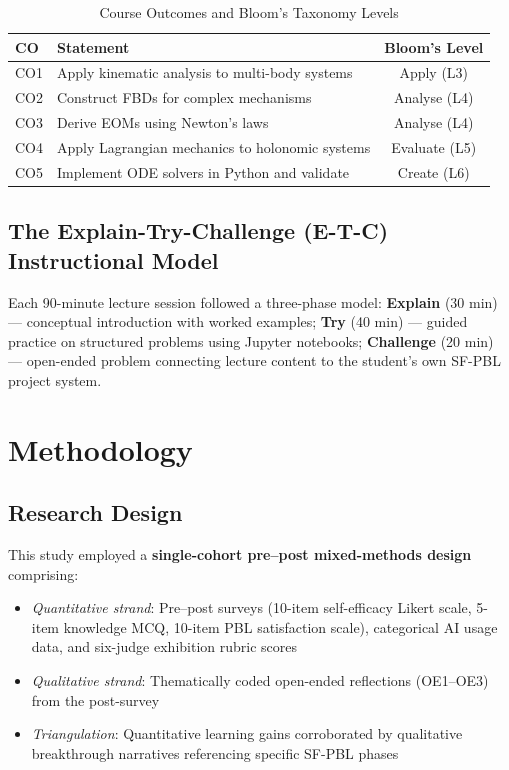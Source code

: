 \documentclass[12pt, a4paper]{article}
\begin{document}
\begin{table}[ht]
\centering
\caption{Course Outcomes and Bloom's Taxonomy Levels}
\label{tab:cos}
\begin{tabular}{p{0.5cm} p{8cm} c}
\toprule
\textbf{CO} & \textbf{Statement} & \textbf{Bloom's Level} \\
\midrule
CO1 & Apply kinematic analysis to multi-body systems    & Apply (L3)    \\
CO2 & Construct FBDs for complex mechanisms             & Analyse (L4)  \\
CO3 & Derive EOMs using Newton's laws                   & Analyse (L4)  \\
CO4 & Apply Lagrangian mechanics to holonomic systems   & Evaluate (L5) \\
CO5 & Implement ODE solvers in Python and validate      & Create (L6)   \\
\bottomrule
\end{tabular}
\end{table}

\subsection{The Explain-Try-Challenge (E-T-C) Instructional Model}

Each 90-minute lecture session followed a three-phase model:
\textbf{Explain} (30 min) --- conceptual introduction with worked
examples; \textbf{Try} (40 min) --- guided practice on structured
problems using Jupyter notebooks; \textbf{Challenge} (20 min) ---
open-ended problem connecting lecture content to the student's own
SF-PBL project system.

\section{Methodology}

\subsection{Research Design}

This study employed a \textbf{single-cohort pre--post
mixed-methods design} \citep{creswell2018designing} comprising:

\begin{itemize}[noitemsep]
  \item \textit{Quantitative strand}: Pre--post surveys (10-item
    self-efficacy Likert scale, 5-item knowledge MCQ, 10-item PBL
    satisfaction scale), categorical AI usage data, and six-judge
    exhibition rubric scores

  \item \textit{Qualitative strand}: Thematically coded open-ended
    reflections (OE1--OE3) from the post-survey

  \item \textit{Triangulation}: Quantitative learning gains
    corroborated by qualitative breakthrough narratives referencing
    specific SF-PBL phases
\end{itemize}
\end{document}
